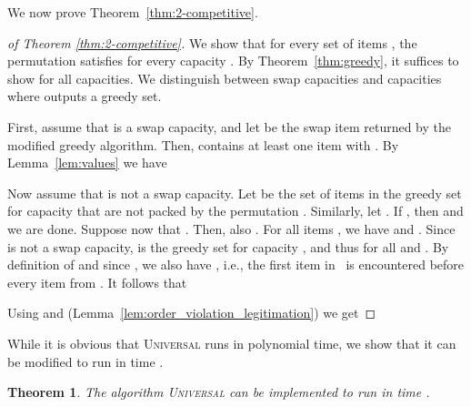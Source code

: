 \documentclass[11pt]{article}
\newcommand{\noun}[1]{\textsc{#1}}
\newtheorem{theorem}{Theorem}
\begin{document}
We now prove Theorem~\ref{thm:2-competitive}.
\begin{proof}
[of Theorem \ref{thm:2-competitive}] We show that for every set of
items , the permutation 
satisfies  for every
capacity . By Theorem~\ref{thm:greedy}, it
suffices to show 
for all capacities. We distinguish between swap capacities and capacities
where  outputs a greedy set.

First, assume that  is a swap capacity, and let 
be the swap item returned by the modified greedy algorithm. Then,
 contains at least one item  with . By
Lemma~\ref{lem:values} we have 



Now assume that  is not a swap capacity. Let 
be the set of items in the greedy set for capacity  that are not
packed by the permutation . Similarly, let .
If , then 
and we are done. Suppose now that . Then, also
. For all items , we have 
and . Since  is not a
swap capacity,  is the greedy set
for capacity , and thus  for
all  and . By definition of  and
since , we also have ,
i.e., the first item  in~ is encountered
before every item from . It follows that 

 Using  and  (Lemma~\ref{lem:order_violation_legitimation})
we get 

\end{proof}
While it is obvious that \noun{Universal} runs in polynomial time,
we show that it can be modified to run in time . 
\begin{theorem}
The algorithm \noun{Universal} can be implemented to run in time .\label{thm:running time
Universal}\end{theorem}
\end{document}
